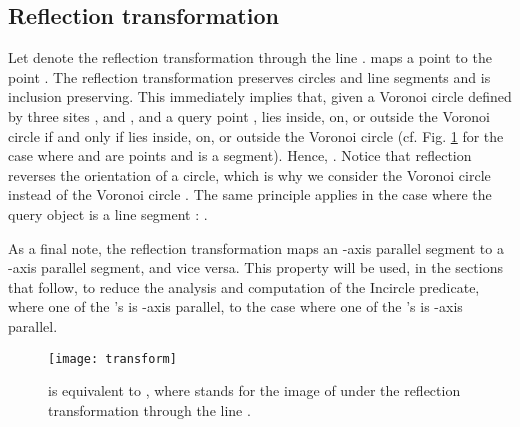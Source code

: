 \documentclass[letterpaper,11pt]{article}
\newcommand{\incircle}{\textsf{Incircle}\xspace}
\newcommand{\vor}{Voronoi\xspace}
\begin{document}
{\begin{comment}
\item Resultants \\
Define , we can evaluate  by evaluating 
. We get that  
are the roots of , where

According to Vieta's formulas, we get that
,
and . Assume , 
the signs of  and  are sufficient to evaluate the 
sign of . 

To distinguish whether  and  or the opposite, 
we evaluate

hence ; If  we 
get , whereas if  we get , 
for .

This method involves examining quantities of maximum 
algebraic degree .
\end{enumerate}
\end{comment}


\subsection{Reflection transformation}
\label{sec:reflection}

Let  denote the reflection transformation
through the line .  maps a point  to the
point . 
The reflection transformation preserves circles and line segments and
is inclusion preserving. This immediately implies that, given a \vor
circle  defined by three sites ,  and ,
and a query point ,  lies inside, on, or outside the \vor circle
 if and only if  lies inside, on, or outside
the \vor circle  (cf. Fig. 
\ref{fig:transform} for the case where  and  are points and
 is a segment). Hence,
.
Notice that reflection reverses the orientation of a circle, which is
why we consider the \vor circle 
instead of the \vor circle .
The same principle applies in the case where the query object is a
line segment :
.

As a final note, the reflection transformation  maps an -axis
parallel segment to a -axis parallel segment, and vice versa. This
property will be used, in the sections that follow, to reduce the
analysis and computation of the \incircle predicate, where one of the
's is -axis parallel, to the case where one of the 's is
-axis parallel.


\begin{figure}[!h]
  \begin{center}
    \texttt{[image: transform]} 
  \end{center}
  \caption{ is equivalent to
    , where
     stands for the image of  under the reflection
    transformation through the line .}
  \label{fig:transform}
\end{figure} 



}
\end{document}
